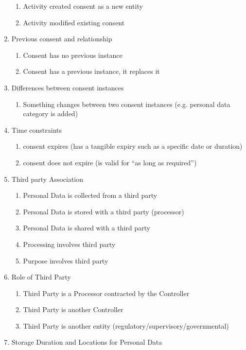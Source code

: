 \begin{enumerate}
  \begin{enumerate}
  \item
    Activity created consent as a new entity
  \item
    Activity modified existing consent
  \end{enumerate}
\item
  Previous consent and relationship

  \begin{enumerate}
  \item
    Consent has no previous instance
  \item
    Consent has a previous instance, it replaces it
  \end{enumerate}
\item
  Differences between consent instances

  \begin{enumerate}
  \item
    Something changes between two consent instances (e.g. personal data
    category is added)
  \end{enumerate}
\item
  Time constraints

  \begin{enumerate}
  \item
    consent expires (has a tangible expiry such as a specific date or
    duration)
  \item
    consent does not expire (is valid for ``as long as required'')
  \end{enumerate}
\item
  Third party Association

  \begin{enumerate}
  \item
    Personal Data is collected from a third party
  \item
    Personal Data is stored with a third party (processor)
  \item
    Personal Data is shared with a third party
  \item
    Processing involves third party
  \item
    Purpose involves third party
  \end{enumerate}
\item
  Role of Third Party

  \begin{enumerate}
  \item
    Third Party is a Processor contracted by the Controller
  \item
    Third Party is another Controller
  \item
    Third Party is another entity (regulatory/supervisory/governmental)
  \end{enumerate}
\item
  Storage Duration and Locations for Personal Data


\end{enumerate}
